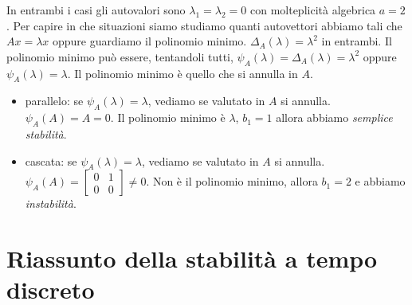 \documentclass[10pt,a4paper]{book}
\begin{document}
In entrambi i casi gli autovalori sono $\lambda _{1} =\lambda _{2} =0$ con molteplicità algebrica $a=2$. Per capire in che situazioni siamo studiamo quanti autovettori abbiamo tali che $Ax=\lambda x$ oppure guardiamo il polinomio minimo. $\Delta _{A}\left( \lambda \right) =\lambda ^{2}$ in entrambi. Il polinomio minimo può essere, tentandoli tutti, $\psi _{A}\left( \lambda \right) =\Delta _{A}\left( \lambda \right) =\lambda ^{2}$ oppure $\psi _{A}\left( \lambda \right) =\lambda $. Il polinomio minimo è quello che si annulla in $A$.
\begin{itemize}
\item parallelo: se $\psi _{A}\left( \lambda \right) =\lambda $, vediamo se valutato in $A$ si annulla. $\psi _{A}\left( A\right) =A=0$. Il polinomio minimo è $\lambda $, $b_{1} =1$ allora abbiamo \textit{semplice stabilità}.
\item cascata: se $\psi _{A}\left( \lambda \right) =\lambda $, vediamo se valutato in $A$ si annulla. $\psi _{A}\left( A\right) =\begin{bmatrix}
0 & 1\\
0 & 0
\end{bmatrix} \neq 0$. Non è il polinomio minimo, allora $b_{1} =2$ e abbiamo \textit{instabilità}.
\end{itemize}
\section{Riassunto della stabilità a tempo discreto}

\end{document}
